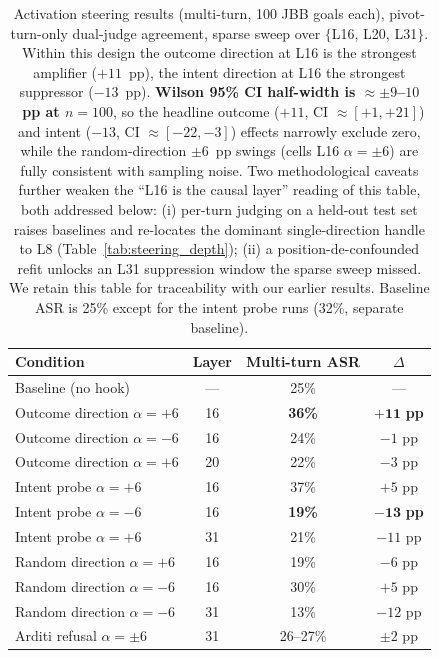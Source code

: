 \documentclass[11pt]{article}
\begin{document}
\begin{table}[h]
\centering
\begin{tabular}{lccc}
\toprule
\textbf{Condition} & \textbf{Layer} & \textbf{Multi-turn ASR} & \textbf{$\Delta$} \\
\midrule
Baseline (no hook)                & --- & 25\% & --- \\
\midrule
Outcome direction $\alpha=+6$    & 16 & \textbf{36\%} & $\mathbf{+11}$ \textbf{pp} \\
Outcome direction $\alpha=-6$    & 16 & 24\% & $-1$ pp \\
Outcome direction $\alpha=+6$    & 20 & 22\% & $-3$ pp \\
\midrule
Intent probe $\alpha=+6$         & 16 & 37\% & $+5$ pp \\%
Intent probe $\alpha=-6$         & 16 & \textbf{19\%} & $\mathbf{-13}$ \textbf{pp} \\
Intent probe $\alpha=+6$         & 31 & 21\% & $-11$ pp \\
\midrule
Random direction $\alpha=+6$     & 16 & 19\% & $-6$ pp \\
Random direction $\alpha=-6$     & 16 & 30\% & $+5$ pp \\
Random direction $\alpha=-6$     & 31 & 13\% & $-12$ pp \\
\midrule
Arditi refusal $\alpha=\pm6$     & 31 & 26--27\% & $\pm2$ pp \\
\bottomrule
\end{tabular}
\caption{Activation steering results (multi-turn, 100 JBB goals each), pivot-turn-only dual-judge agreement, sparse sweep over $\{$L16, L20, L31$\}$. Within this design the outcome direction at L16 is the strongest amplifier ($+11$~pp), the intent direction at L16 the strongest suppressor ($-13$~pp). \textbf{Wilson 95\% CI half-width is $\approx \pm 9$--$10$~pp at $n{=}100$}, so the headline outcome ($+11$, CI $\approx [+1, +21]$) and intent ($-13$, CI $\approx [-22, -3]$) effects narrowly exclude zero, while the random-direction $\pm 6$~pp swings (cells L16 $\alpha{=}\pm 6$) are fully consistent with sampling noise. Two methodological caveats further weaken the ``L16 is the causal layer'' reading of this table, both addressed below: (i) per-turn judging on a held-out test set raises baselines and re-locates the dominant single-direction handle to L8 (Table~\ref{tab:steering_depth}); (ii) a position-de-confounded refit unlocks an L31 suppression window the sparse sweep missed. We retain this table for traceability with our earlier results. Baseline ASR is 25\% except for the intent probe runs (32\%, separate baseline).}
\label{tab:steering}
\end{table}
\end{document}
